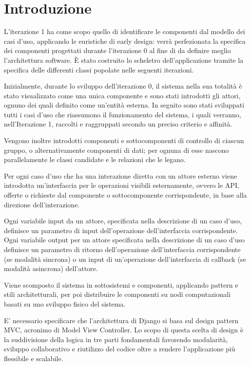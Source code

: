 \section{Introduzione}

L'iterazione 1 ha come scopo quello di identificare le componenti dal modello dei casi d'uso, 
applicando le euristiche di early design: verrà perfezionata la specifica dei componenti 
progettati durante l'iterazione 0 al fine di da definire meglio l'architettura software. 
È stato costruito lo scheletro dell'applicazione tramite la specifica delle differenti classi 
popolate nelle seguenti iterazioni.

Inizialmente, durante lo sviluppo dell'iterazione 0, il sistema nella sua totalità è stato 
visualizzato come una unica componente e sono stati 
introdotti gli attori, ognuno dei quali definito come un'entità esterna. In seguito sono stati 
sviluppati tutti i casi d'uso che riassumono il funzionamento del sistema, i quali verranno, 
nell'Iterazione 1, raccolti e raggruppati secondo un preciso criterio e affinità. 

Vengono inoltre introdotti componenti e sottocomponenti di controllo di ciascun gruppo, o 
alternativamente componenti di dati; per ognuna di esse nascono parallelamente le classi 
candidate e le relazioni che le legano. 

Per ogni caso d'uso che ha una interazione diretta con un attore esterno viene introdotta 
un'interfaccia per le operazioni visibili esternamente, ovvero le API, offerte o richieste 
dal componente o sottocomponente corrispondente, in base alla direzione dell'interazione. 

Ogni variabile input da un attore, specificata nella descrizione di un caso d'uso, 
definisce un parametro di input dell'operazione dell'interfaccia corrispondente. 
Ogni variabile output per un attore specificata nella descrizione di un caso d'uso 
definisce un parametro di ritorno dell'operazione dell'interfaccia corrispondente 
(se modalità sincrona) o un input di un'operazione dell'interfaccia di callback (se modalità asincrona) dell'attore. 

Viene scomposto il sistema in sottosistemi e componenti, applicando pattern e 
stili architetturali, per poi distribuire le componenti su nodi computazionali basati su 
uno sviluppo fisico del sistema.


E' necessario specificare che l'architettura di Django si basa sul design pattern MVC, acronimo di Model View 
Controller. Lo scopo di questa scelta di design è la suddivisione della logica in 
tre parti fondamentali favorendo modularità, sviluppo collaborativo e riutilizzo del 
codice oltre a rendere l'applicazione più flessibile e scalabile.
    
